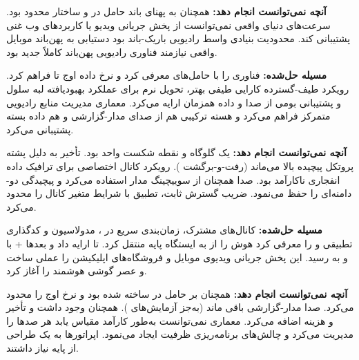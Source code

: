 \textbf{آنچه نمی‌توانست انجام دهد:}  همچنان به پهنای باند حامل  در  و ساختار  محدود بود. سرعت‌های دنیای واقعی  نمی‌توانست از پخش جریانی ویدیو یا کاربردهای وب غنی پشتیبانی کند. محدودیت بنیادی واسط رادیویی باریک-باند بود  دستیابی به پهن‌باند موبایل واقعی نیازمند فناوری رادیویی پهن‌باند کاملاً جدید بود.


\textbf{مسیله حل‌شده:}  فناوری  را با حامل‌های  معرفی کرد و نرخ داده اوج تا  فراهم کرد. رویکرد طیف-گسترده کارایی طیفی بهتر، تحویل نرم برای عملکرد بهبودیافته لبه سلول و پشتیبانی بومی از صدا و داده همزمان ارایه می‌کرد. معماری  مدیریت منابع رادیویی متمرکز فراهم می‌کرد و هسته ترکیبی  هم از صدای مدار-گزارشی و هم داده بسته پشتیبانی می‌کرد.

\textbf{آنچه نمی‌توانست انجام دهد:}  یک گلوگاه و نقطه شکست واحد بود. تأخیر به دلیل پشته پروتکل پیچیده بالا می‌ماند (رفت-و-برگشت ). رویکرد کانال اختصاصی برای ترافیک داده انفجاری ناکارآمد بود. صدا همچنان از سوییچینگ مدار استفاده می‌کرد و پیچیدگی دو-دامنه‌ای را حفظ می‌نمود. ضریب گسترش ثابت، تطبیق با شرایط متغیر کانال را محدود می‌کرد.


\textbf{مسیله حل‌شده:}  کانال‌های مشترک، زمان‌بندی سریع در ، مدولاسیون و کدگذاری تطبیقی  و  را معرفی کرد  هوش را از  به ایستگاه پایه منتقل کرد.  تا  ارایه داد و بعدها + با  و  به  رسید. این پخش جریانی ویدیوی موبایل و فروشگاه‌های اپلیکیشن را عملی ساخت و عصر گوشی هوشمند را آغاز کرد.

\textbf{آنچه نمی‌توانست انجام دهد:}  همچنان بر حامل  در  ساخته شده بود و نرخ اوج را محدود می‌کرد. صدا مدار-گزارشی باقی ماند (به‌جز آزمایش‌های ).  همچنان وجود داشت و تأخیر و هزینه اضافه می‌کرد. معماری نمی‌توانست به‌طور کارآمد مقیاس یابد  هر  صدها  را مدیریت می‌کرد و چالش‌های برنامه‌ریزی ظرفیت ایجاد می‌نمود. اپراتورها به یک طراحی از پایه نیاز داشتند.


